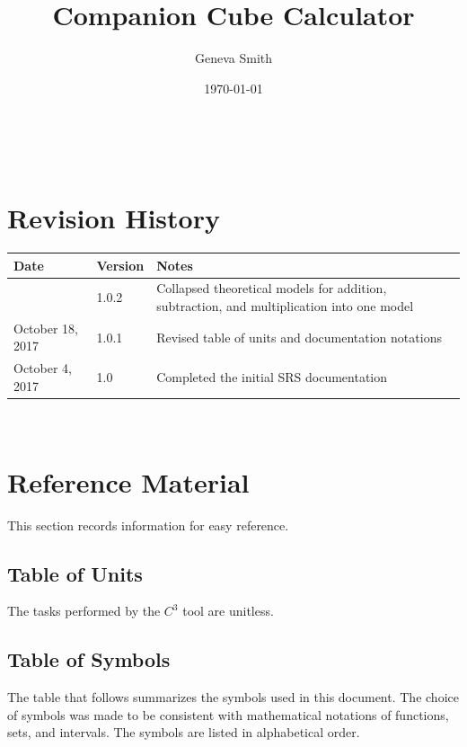 \documentclass[12pt]{article}
\newcommand{\prognameAbbrv}{$C^{3}$}
\begin{document}
\title{Companion Cube Calculator} 
\author{Geneva Smith}
\date{\today}
	
\maketitle

~\newpage


\section{Revision History}

\begin{tabularx}{\textwidth}{p{3cm}p{2cm}X}
\toprule {\bf Date} & {\bf Version} & {\bf Notes}\\
\midrule
 & 1.0.2 & Collapsed theoretical models for addition, subtraction, and 
 multiplication into one model\\
October 18, 2017 & 1.0.1 & Revised table of units and documentation notations \\
October 4, 2017 & 1.0 & Completed the initial SRS documentation\\
\bottomrule
\end{tabularx}

~\newpage

\section{Reference Material}

This section records information for easy reference.

\subsection{Table of Units}

The tasks performed by the \prognameAbbrv{} tool are unitless.

\subsection{Table of Symbols}

The table that follows summarizes the symbols used in this document. The choice 
of symbols was made to be consistent with mathematical notations of functions, 
sets, and intervals. The symbols are listed in alphabetical order.
\end{document}
